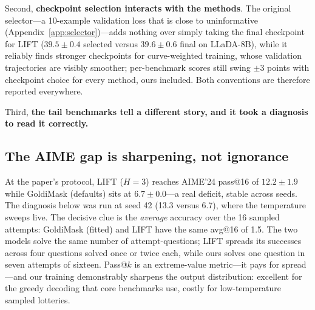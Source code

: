 \documentclass{article} %
\begin{document}
Second, \textbf{checkpoint selection interacts with the methods}. The original selector---a 10-example validation loss that is close to uninformative (Appendix~\ref{app:selector})---adds nothing over simply taking the final checkpoint for LIFT ($39.5 \pm 0.4$ selected versus $39.6 \pm 0.6$ final on LLaDA-8B), while it reliably finds stronger checkpoints for curve-weighted training, whose validation trajectories are visibly smoother; per-benchmark scores still swing $\pm 3$ points with checkpoint choice for every method, ours included. Both conventions are therefore reported everywhere.

Third, \textbf{the tail benchmarks tell a different story, and it took a diagnosis to read it correctly.}

\subsection{The AIME gap is sharpening, not ignorance}
\label{sec:aime}

At the paper's protocol, LIFT ($H{=}3$) reaches AIME'24 pass@16 of $12.2 \pm 1.9$ while GoldiMask (defaults) sits at $6.7 \pm 0.0$---a real deficit, stable across seeds. The diagnosis below was run at seed 42 (13.3 versus 6.7), where the temperature sweeps live. The decisive clue is the \emph{average} accuracy over the 16 sampled attempts: GoldiMask (fitted) and LIFT have the same avg@16 of 1.5. The two models solve the same number of attempt-questions; LIFT spreads its successes across four questions solved once or twice each, while ours solves one question in seven attempts of sixteen. Pass@$k$ is an extreme-value metric---it pays for spread---and our training demonstrably sharpens the output distribution: excellent for the greedy decoding that core benchmarks use, costly for low-temperature sampled lotteries.
\end{document}
